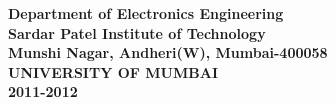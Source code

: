 \centering
\textbf {Department of Electronics Engineering\\
Sardar Patel Institute of Technology\\
Munshi Nagar, Andheri(W), Mumbai-400058\\
UNIVERSITY OF MUMBAI\\
2011-2012\\
}